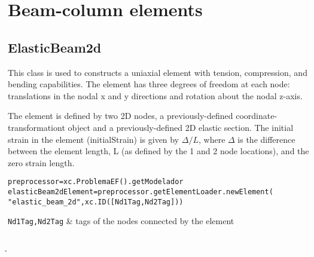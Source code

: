 \begin{methodsTable}
\ElementMeth{}
\ElementOneDMeth{}
\ProtoTrussMeth{}
\end{methodsTable}

\section{Beam-column elements}

\subsection{ElasticBeam2d}
This class is used to constructs a uniaxial element with tension, compression, and bending capabilities. The element has three degrees of freedom at each node: translations in the nodal x and y directions and rotation about the nodal z-axis.

The element is defined by two 2D nodes, a previously-defined coordinate-transformationt object and a previously-defined 2D elastic section. The initial strain in the element (initialStrain) is given by $\Delta/L$, where $\Delta$ is the difference between the element length, L (as defined by the 1 and 2 node locations), and the zero strain length. 

\begin{verbatim}
preprocessor=xc.ProblemaEF().getModelador
elasticBeam2dElement=preprocessor.getElementLoader.newElement(
"elastic_beam_2d",xc.ID([Nd1Tag,Nd2Tag]))
\end{verbatim}
\begin{paramFuncTable}
{\tt Nd1Tag,Nd2Tag} & tags of the nodes connected by the element\\
\end{paramFuncTable}

\begin{paramClassTable}
\ElementParam{}
\ElementOneDParam{}
\ProtoBeamTwoDParam{}
\rhoX{} \\
\h{}  \\
\initialStrain{} \\
\getV{} \\
\getVOne{} \\
\getVTwo{} \\
\getNOne{} \\
\getNTwo{} \\
\getMOne{} \\
\getMTwo{} \\
\end{paramClassTable}


